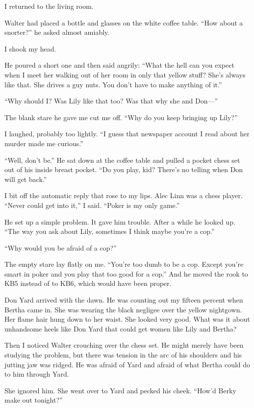 \documentclass{novel}
\begin{document}
I returned to the living room.

Walter had placed a bottle and glasses on the white coffee table. “How about a snorter?” he asked almost amiably.

I shook my head.

He poured a short one and then said angrily: “What the hell can you expect when I meet her walking out of her room in only that yellow stuff? She’s always like that. She drives a guy nuts. You don’t have to make anything of it.”

“Why should I? Was Lily like that too? Was that why she and Don—”

The blank stare he gave me cut me off. “Why do you keep bringing up Lily?”

I laughed, probably too lightly. “I guess that newspaper account I read about her murder made me curious.”

“Well, don’t be.” He sat down at the coffee table and pulled a pocket chess set out of his inside breast pocket. “Do you play, kid? There’s no telling when Don will get back.”

I bit off the automatic reply that rose to my lips. Alec Linn was a chess player. “Never could get into it,” I said. “Poker is my only game.”

He set up a simple problem. It gave him trouble. After a while he looked up. “The way you ask about Lily, sometimes I think maybe you’re a cop.”

“Why would you be afraid of a cop?”

The empty stare lay flatly on me. “You’re too dumb to be a cop. Except you’re smart in poker and you play that too good for a cop.” And he moved the rook to KB5 instead of to KB6, which would have been proper.

Don Yard arrived with the dawn. He was counting out my fifteen percent when Bertha came in. She was wearing the black negligee over the yellow nightgown. Her flame hair hung down to her waist. She looked very good. What was it about unhandsome heels like Don Yard that could get women like Lily and Bertha?

Then I noticed Walter crouching over the chess set. He might merely have been studying the problem, but there was tension in the arc of his shoulders and his jutting jaw was ridged. He was afraid of Yard and afraid of what Bertha could do to him through Yard.

She ignored him. She went over to Yard and pecked his cheek. “How’d Berky make out tonight?”
\end{document}
